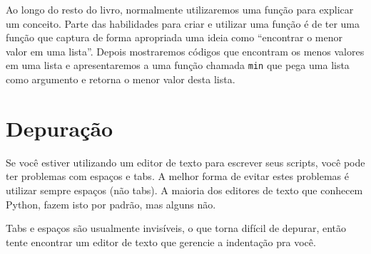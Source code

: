 
Ao longo do resto do livro, normalmente utilizaremos uma função para explicar
um conceito. Parte das habilidades para criar e utilizar uma função é de ter
uma função que captura de forma apropriada uma ideia como ``encontrar o menor
valor em uma lista''. Depois mostraremos códigos que encontram os menos
valores em uma lista e apresentaremos a uma função chamada {\tt min} que
pega uma lista como argumento e retorna o menor valor desta lista.


\section{Depuração}
\label{editor}


Se você estiver utilizando um editor de texto para escrever seus scripts,
você pode ter problemas com espaços e tabs. A melhor forma de evitar estes
problemas é utilizar sempre espaços (não tabs). A maioria dos editores de
texto que conhecem Python, fazem isto por padrão, mas alguns não.



Tabs e espaços são usualmente invisíveis, o que torna difícil de depurar,
então tente encontrar um editor de texto que gerencie a indentação pra
você.


